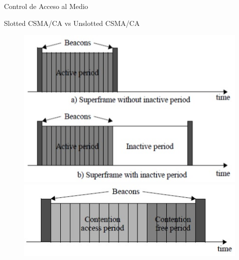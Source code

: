 \documentclass[aspectratio=169]{beamer}
\begin{document}

\begin{frame}[T]{Control de Acceso al Medio}

Slotted CSMA/CA vs Unslotted CSMA/CA
\vspace{10px}
		\begin{figure}[H]
			\includegraphics[height=.4\textheight]{./imagenes/superframe.jpg}\\
			\vspace{15px}
			\includegraphics[height=.3\textheight]{./imagenes/unsolotted.jpg}
		\end{figure}
\end{frame}
\end{document}
